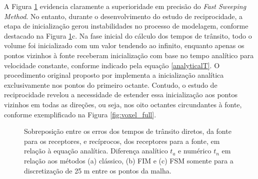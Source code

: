 A Figura \ref{fig:reciprocity_refraction_study} evidencia claramente a superioridade em precisão do \textit{Fast Sweeping Method}. No entanto, durante o desenvolvimento do estudo de reciprocidade, a etapa de inicialização gerou instabilidades no processo de modelagem, conforme destacado na Figura \ref{fig:reciprocity_refraction_study}c. Na fase inicial do cálculo dos tempos de trânsito, todo o volume foi inicializado com um valor tendendo ao infinito, enquanto apenas os pontos vizinhos à fonte receberam inicialização com base no tempo analítico para velocidade constante, conforme indicado pela equação \ref{analyticalT}. O procedimento original proposto por  implementa a inicialização analítica exclusivamente nos pontos do primeiro octante. Contudo, o estudo de reciprocidade revelou a necessidade de estender essa inicialização aos pontos vizinhos em todas as direções, ou seja, nos oito octantes circundantes à fonte, conforme exemplificado na Figura \ref{fig:voxel_full}.

\begin{figure}[H]
	\centering
	\newline
	\newline
	
	\caption{Sobreposição entre os erros dos tempos de trânsito diretos, da fonte para os receptores, e recíprocos, dos receptores para a fonte, em relação à equação analítica. Diferença analítico $t_a$ e numérico $t_n$ em relação aos métodos (a) clássico, (b) FIM e (c) FSM somente para a discretização de 25 m entre os pontos da malha.}  
	\label{fig:reciprocity_refraction_study}
\end{figure}

